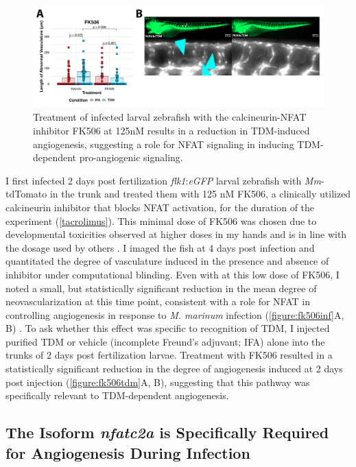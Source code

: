 \begin{figure}
\centering
\includegraphics[width=\textwidth]{images/fk506tdm.pdf}
\caption[FK506 treatment inhibits TDM-mediated angiogenesis]{Treatment of infected larval zebrafish with the calcineurin\hyp{}NFAT inhibitor FK506 at 125nM results in a reduction in TDM\hyp{}induced angiogenesis, suggesting a role for NFAT signaling in inducing TDM\hyp{}dependent pro\hyp{}angiogenic signaling.}
\label{figure:fk506tdm}
\end{figure}

I first infected 2 days post fertilization \textit{flk1}:\textit{eGFP} larval zebrafish with \textit{Mm}\hyp{}tdTomato in the trunk and treated them with 125 nM FK506, a clinically utilized calcineurin inhibitor that blocks NFAT activation, for the duration of the experiment \citep{Ellis1995} (\autoref{tacrolimus}). This minimal dose of FK506 was chosen due to developmental toxicities observed at higher doses in my hands and is in line with the dosage used by others \citep{Kujawski2014}. I imaged the fish at 4 days post infection and quantitated the degree of vasculature induced in the presence and absence of inhibitor under computational blinding. Even with at this low dose of FK506, I noted a small, but statistically significant reduction in the mean degree of neovascularization at this time point, consistent with a role for NFAT in controlling angiogenesis in response to \textit{M. marinum} infection (\autoref{figure:fk506inf}A, B) \citep{Kujawski2014}. To ask whether this effect was specific to recognition of TDM, I injected purified TDM or vehicle (incomplete Freund's adjuvant; IFA) alone into the trunks of 2 days post fertilization larvae. Treatment with FK506 resulted in a statistically significant reduction in the degree of angiogenesis induced at 2 days post injection (\autoref{figure:fk506tdm}A, B), suggesting that this pathway was specifically relevant to TDM\hyp{}dependent angiogenesis.

\subsection{The Isoform \textit{nfatc2a} is Specifically Required for Angiogenesis During Infection}

